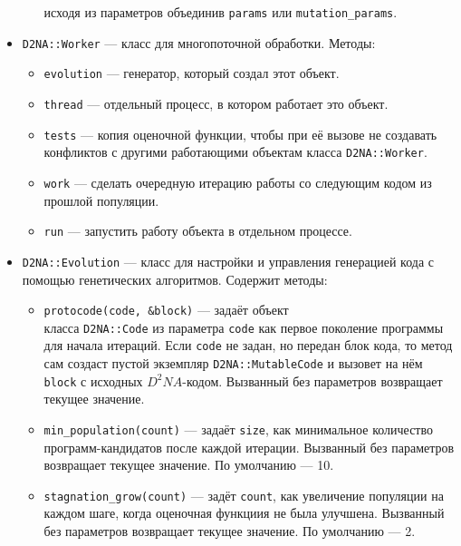 \documentclass[utf8,a5paper,portrait,10pt]{eskdtext}
\begin{document}
\begin{itemize}
\begin{itemize}
               исходя из параметров объединив \texttt{params} или
               \texttt{mutation\_params}.
       \end{itemize}
  \item \texttt{D2NA::Worker} — класс для многопоточной обработки. Методы:
      \begin{itemize}
        \item \texttt{evolution} — генератор, который создал этот объект.
        \item \texttt{thread} — отдельный процесс, в котором работает это
              объект.
        \item \texttt{tests} — копия оценочной функции, чтобы при её вызове
              не создавать конфликтов с другими работающими объектам класса
              \texttt{D2NA::Worker}.
        \item \texttt{work} — сделать очередную итерацию работы со следующим
              кодом из прошлой популяции.
        \item \texttt{run} — запустить работу объекта в отдельном процессе.
      \end{itemize}
  \item \texttt{D2NA::Evolution} — класс для настройки и управления генерацией
        кода с помощью генетических алгоритмов. Содержит методы:
        \begin{itemize}
          \item \texttt{protocode(code, \&block)} — задаёт объект\\ класса
                \texttt{D2NA::Code} из параметра \texttt{code} как первое
                поколение программы для начала итераций. Если \texttt{code} не
                задан, но передан блок кода, то метод сам создаст пустой
                экземпляр \texttt{D2NA::MutableCode} и вызовет на нём
                \texttt{block} с исходных $D^2NA$-кодом. Вызванный без
                параметров возвращает текущее значение.
          \item \texttt{min\_population(count)} — задаёт \texttt{size}, как
                минимальное количество программ-кандидатов после каждой
                итерации. Вызванный без параметров возвращает текущее значение.
                По умолчанию — 10.
          \item \texttt{stagnation\_grow(count)} — задёт \texttt{count}, как
                увеличение популяции на каждом шаге, когда оценочная функциия
                не была улучшена. Вызванный без параметров возвращает текущее
                значение. По умолчанию — 2.

\end{itemize}
\end{itemize}
\end{document}
